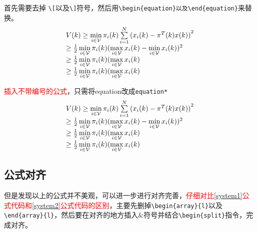\documentclass[master]{styles/hdu-thesis}
\begin{document}
首先需要去掉 \verb|\[|以及\verb|\]|符号，然后用\verb+\begin{equation}以及\end{equation}+来替换。
\begin{equation}\label{system1}
  \begin{array}{l}
V(k) \ge \mathop {\min }\limits_{i \in {\cal V}} {\pi _i}(k)\sum\limits_{i = 1}^N {{{({x_i}(k) - {\pi ^T}(k)x(k))}^2}} \\
 \ge \frac{1}{2}\mathop {\min }\limits_{i \in {\cal V}} {\pi _i}(k){(\mathop {\max }\limits_{i \in {\cal V}} {x_i}(k) - \mathop {\min }\limits_{i \in {\cal V}} {x_i}(k))^2}\\
 \ge \frac{1}{2}\mathop {\min }\limits_{i \in {\cal V}} {\pi _i}(k)(\mathop {\max }\limits_{i \in {\cal V}} {x_i}(k)\\
 \ge \frac{1}{2}\mathop {\min }\limits_{i \in {\cal V}} {\pi _i}(k)(\mathop {\max }\limits_{i \in {\cal V}} {x_i}(k)
\end{array}
\end{equation}

\textcolor{red}{插入不带编号的公式}，只需将equation改成\verb+equation*+
\begin{equation*}
  \begin{array}{l}
V(k) \ge \mathop {\min }\limits_{i \in {\cal V}} {\pi _i}(k)\sum\limits_{i = 1}^N {{{({x_i}(k) - {\pi ^T}(k)x(k))}^2}} \\
 \ge \frac{1}{2}\mathop {\min }\limits_{i \in {\cal V}} {\pi _i}(k){(\mathop {\max }\limits_{i \in {\cal V}} {x_i}(k) - \mathop {\min }\limits_{i \in {\cal V}} {x_i}(k))^2}\\
 \ge \frac{1}{2}\mathop {\min }\limits_{i \in {\cal V}} {\pi _i}(k)(\mathop {\max }\limits_{i \in {\cal V}} {x_i}(k)\\
 \ge \frac{1}{2}\mathop {\min }\limits_{i \in {\cal V}} {\pi _i}(k)(\mathop {\max }\limits_{i \in {\cal V}} {x_i}(k)
\end{array}
\end{equation*}


\subsection{公式对齐}

但是发现以上的公式并不美观，可以进一步进行对齐完善，\textcolor{red}{仔细对比\eqref{system1}公式代码和\eqref{system2}公式代码的区别}，主要先删掉\verb+\begin{array}{l}+以及\verb+\end{array}{l}+，然后要在对齐的地方插入$\&$符号并结合\verb+\begin{split}+指令，完成对齐。
\end{document}
